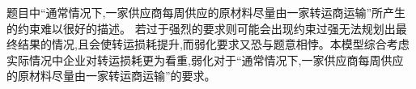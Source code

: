题目中“通常情况下,一家供应商每周供应的原材料尽量由一家转运商运输”所产生的约束难以很好的描述。
若过于强烈的要求则可能会出现约束过强无法规划出最终结果的情况,且会使转运损耗提升,而弱化要求又恐与题意相悖。本模型综合考虑实际情况中企业对转运损耗更为看重,弱化对于“通常情况下,一家供应商每周供应的原材料尽量由一家转运商运输”的要求。
